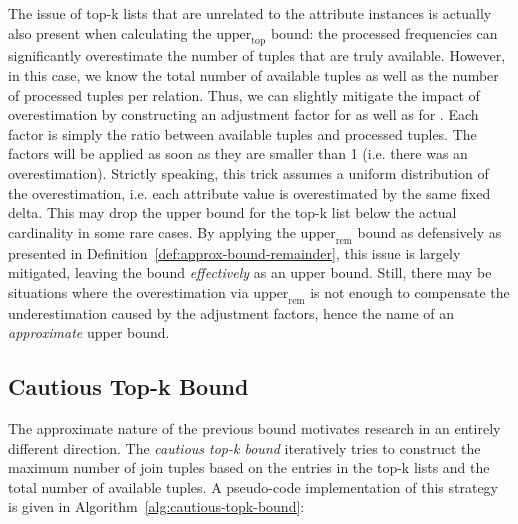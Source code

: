 The issue of top-k lists that are unrelated to the attribute instances is actually also present when calculating the $\text{upper}_\text{top}$ bound: the processed frequencies can significantly overestimate the number of tuples that are truly available. 
However, in this case, we know the total number of available tuples as well as the number of processed tuples per relation. 
Thus, we can slightly mitigate the impact of overestimation by constructing an adjustment factor for  as well as for . 
Each factor is simply the ratio between available tuples and processed tuples. 
The factors will be applied as soon as they are smaller than 1 (i.e. there was an overestimation). 
Strictly speaking, this trick assumes a uniform distribution of the overestimation, i.e. each attribute value is overestimated by the same fixed delta. 
This may drop the upper bound for the top-k list below the actual cardinality in some rare cases. 
By applying the $\text{upper}_\text{rem}$ bound as defensively as presented in Definition~\ref{def:approx-bound-remainder}, this issue is largely mitigated, leaving the bound \emph{effectively} as an upper bound. 
Still, there may be situations where the overestimation via $\text{upper}_\text{rem}$ is not enough to compensate the underestimation caused by the adjustment factors, hence the name of an \emph{approximate} upper bound.

\subsection{Cautious Top-k Bound}
\label{sec:tighter-bounds-cautious}

The approximate nature of the previous bound motivates research in an entirely different direction. 
The \emph{cautious top-k bound} iteratively tries to construct the maximum number of join tuples based on the entries in the top-k lists and the total number of available tuples. A pseudo-code implementation of this strategy is given in Algorithm~\ref{alg:cautious-topk-bound}:

